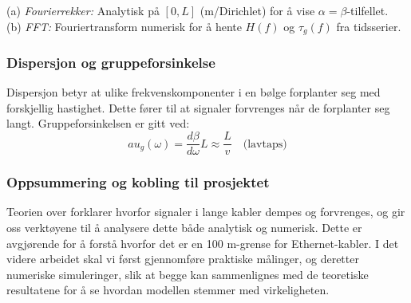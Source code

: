 (a) \textit{Fourierrekker:} Analytisk på $[0,L]$ (m/Dirichlet) for å vise $\alpha=\beta$-tilfellet.\\
(b) \textit{FFT:} Fouriertransform numerisk for å hente $H(f)$ og $\tau_g(f)$ fra tidsserier.

\subsubsection{Dispersjon og gruppeforsinkelse}

Dispersjon betyr at ulike frekvenskomponenter i en bølge forplanter seg med forskjellig hastighet. Dette fører til at signaler forvrenges når de forplanter seg langt. Gruppeforsinkelsen er gitt ved:
\begin{equation}
	au_g(\omega) = \frac{d\beta}{d\omega} L \approx \frac{L}{v} \quad \text{(lavtaps)}
\end{equation}

\subsubsection{Oppsummering og kobling til prosjektet}

Teorien over forklarer hvorfor signaler i lange kabler dempes og forvrenges, og gir oss verktøyene til å analysere dette både analytisk og numerisk. Dette er avgjørende for å forstå hvorfor det er en 100 m-grense for Ethernet-kabler. I det videre arbeidet skal vi først gjennomføre praktiske målinger, og deretter numeriske simuleringer, slik at begge kan sammenlignes med de teoretiske resultatene for å se hvordan modellen stemmer med virkeligheten.